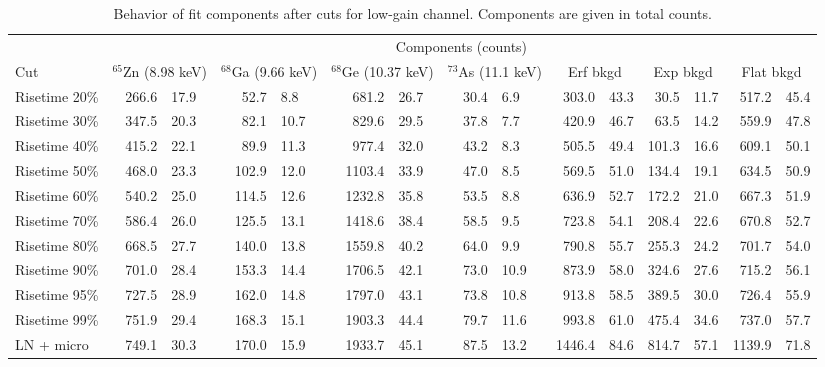 						\begin{sidewaystable}
							\centering
							\footnotesize
							\begin{tabular}{l  r@{$~\pm~$}l  r@{$~\pm~$}l  r@{$~\pm~$}l  r@{$~\pm~$}l  r@{$~\pm~$}l  r@{$~\pm~$}l  r@{$~\pm~$}l  }
							\toprule 
							& \multicolumn{14}{c}{Components (counts)} \\
							\cmidrule[1pt]{2-14} 
							Cut & \multicolumn{2}{c}{$^{65}$Zn (8.98 keV)} & \multicolumn{2}{c}{$^{68}$Ga (9.66 keV)} & \multicolumn{2}{c}{$^{68}$Ge (10.37 keV)} & \multicolumn{2}{c}{$^{73}$As (11.1 keV)} & \multicolumn{2}{c}{Erf bkgd} & \multicolumn{2}{c}{Exp bkgd} & \multicolumn{2}{c}{Flat bkgd}  \\
							\midrule
						        	 Risetime 20\% & 266.6 & 17.9 & 52.7 & 8.8 & 681.2 & 26.7 & 30.4 & 6.9 & 303.0 & 43.3 & 30.5 & 11.7 & 517.2 & 45.4  \\
								 Risetime 30\% & 347.5 & 20.3 & 82.1 & 10.7 & 829.6 & 29.5 & 37.8 & 7.7 & 420.9 & 46.7 & 63.5 & 14.2 & 559.9 & 47.8  \\
								 Risetime 40\% & 415.2 & 22.1 & 89.9 & 11.3 & 977.4 & 32.0 & 43.2 & 8.3 & 505.5 & 49.4 & 101.3 & 16.6 & 609.1 & 50.1  \\
								 Risetime 50\% & 468.0 & 23.3 & 102.9 & 12.0 & 1103.4 & 33.9 & 47.0 & 8.5 & 569.5 & 51.0 & 134.4 & 19.1 & 634.5 & 50.9  \\
								 Risetime 60\% & 540.2 & 25.0 & 114.5 & 12.6 & 1232.8 & 35.8 & 53.5 & 8.8 & 636.9 & 52.7 & 172.2 & 21.0 & 667.3 & 51.9  \\
								 Risetime 70\% & 586.4 & 26.0 & 125.5 & 13.1 & 1418.6 & 38.4 & 58.5 & 9.5 & 723.8 & 54.1 & 208.4 & 22.6 & 670.8 & 52.7  \\
								 Risetime 80\% & 668.5 & 27.7 & 140.0 & 13.8 & 1559.8 & 40.2 & 64.0 & 9.9 & 790.8 & 55.7 & 255.3 & 24.2 & 701.7 & 54.0  \\
								 Risetime 90\% & 701.0 & 28.4 & 153.3 & 14.4 & 1706.5 & 42.1 & 73.0 & 10.9 & 873.9 & 58.0 & 324.6 & 27.6 & 715.2 & 56.1  \\
								 Risetime 95\% & 727.5 & 28.9 & 162.0 & 14.8 & 1797.0 & 43.1 & 73.8 & 10.8 & 913.8 & 58.5 & 389.5 & 30.0 & 726.4 & 55.9  \\
								 Risetime 99\% & 751.9 & 29.4 & 168.3 & 15.1 & 1903.3 & 44.4 & 79.7 & 11.6 & 993.8 & 61.0 & 475.4 & 34.6 & 737.0 & 57.7  \\
								 LN + micro & 749.1 & 30.3 & 170.0 & 15.9 & 1933.7 & 45.1 & 87.5 & 13.2 & 1446.4 & 84.6 & 814.7 & 57.1 & 1139.9 & 71.8  \\
							 
							\bottomrule
							\end{tabular}
							\caption[Behavior of fit components after cuts for low-gain BeGe channel]
							{Behavior of fit components after cuts for low-gain channel.  Components are given in total counts.}
							\label{tab:RTLowGainResults}
						\end{sidewaystable}						

